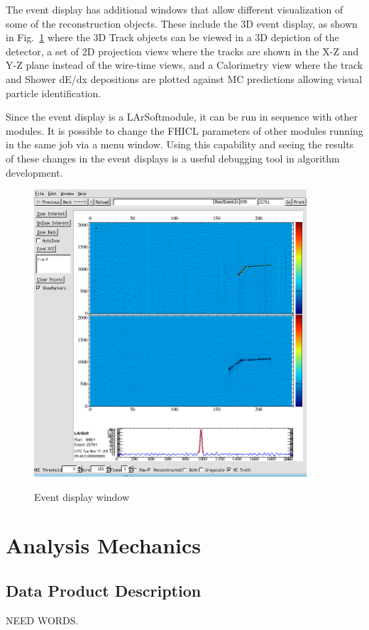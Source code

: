 \documentclass[12pt]{elsarticle}
\newcommand{\larsoft}{LArSoft}
\begin{document}
The event display has additional windows that allow different visualization of some of the reconstruction objects. These include the 3D event display, as shown in Fig.~\ref{2d_event} where the 3D Track objects can be viewed in a 3D depiction of the detector, a set of 2D projection views where the tracks are shown in the X-Z and Y-Z plane instead of the wire-time views, and a Calorimetry view where the track and Shower dE/dx depositions are plotted against MC predictions allowing visual particle identification. 

Since the event display is a \larsoft module, it can be run in sequence with other modules. It is possible to change the FHICL parameters of other modules running in the same job via a menu window. Using this capability and seeing the results of these changes in the event displays is a useful debugging tool in algorithm development.


\hspace*{2cm}
\begin{figure}[h]
\centering
\caption{Event display window}
\includegraphics[width=4.0in]{./imgs/larsoft_2d_event_display.png}
\label{2d_event}
\end{figure}

               
\section{Analysis Mechanics}

\subsection{Data Product Description}
NEED WORDS.
\end{document}
